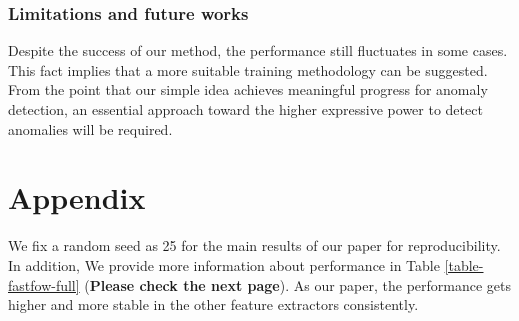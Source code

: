 \documentclass[letterpaper]{article}
\begin{document}
\subsubsection{Limitations and future works}
Despite the success of our method, the performance still fluctuates in some cases. This fact implies that a more suitable training methodology can be suggested. From the point that our simple idea achieves meaningful progress for anomaly detection, an essential approach toward the higher expressive power to detect anomalies will be required.



\appendix
\setcounter{table}{0}
\renewcommand{\thetable}{A\arabic{table}}
\section{Appendix}

We fix a random seed as 25 for the main results of our paper for reproducibility. In addition, We provide more information about performance in Table \ref{table-fastfow-full} (\textbf{Please check the next page}). As our paper, the performance gets higher and more stable in the other feature extractors consistently. 
\end{document}
